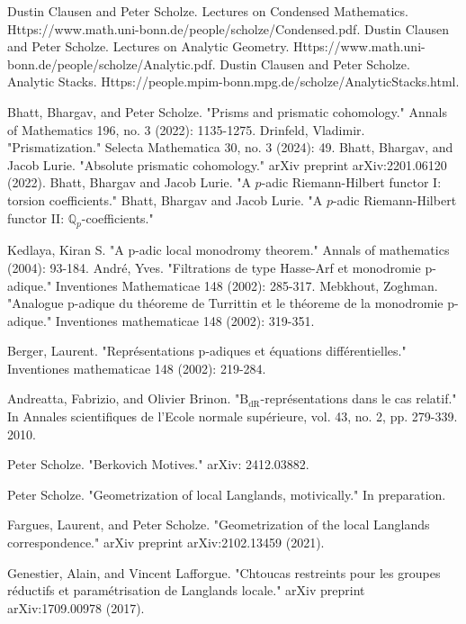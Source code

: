 \documentclass[12pt]{article}
\theoremstyle{definition}
\begin{document}
\begin{thebibliography}{}
 Dustin Clausen and Peter Scholze. Lectures on Condensed Mathematics. Https://www.math.uni-bonn.de/people/scholze/Condensed.pdf.
 Dustin Clausen and Peter Scholze. Lectures on Analytic Geometry. Https://www.math.uni-bonn.de/people/scholze/Analytic.pdf.
 Dustin Clausen and Peter Scholze. Analytic Stacks. Https://people.mpim-bonn.mpg.de/scholze/AnalyticStacks.html.

 Bhatt, Bhargav, and Peter Scholze. "Prisms and prismatic cohomology." Annals of Mathematics 196, no. 3 (2022): 1135-1275. 
 Drinfeld, Vladimir. "Prismatization." Selecta Mathematica 30, no. 3 (2024): 49.
 Bhatt, Bhargav, and Jacob Lurie. "Absolute prismatic cohomology." arXiv preprint arXiv:2201.06120 (2022).
 Bhatt, Bhargav and Jacob Lurie. "A $p$-adic Riemann-Hilbert functor I: torsion coefficients."
 Bhatt, Bhargav and Jacob Lurie. "A $p$-adic Riemann-Hilbert functor II: $\mathbb{Q}_p$-coefficients."

 Kedlaya, Kiran S. "A p-adic local monodromy theorem." Annals of mathematics (2004): 93-184.
 Andr\'e, Yves. "Filtrations de type Hasse-Arf et monodromie p-adique." Inventiones Mathematicae 148 (2002): 285-317.
 Mebkhout, Zoghman. "Analogue p-adique du th\'eoreme de Turrittin et le th\'eoreme de la monodromie p-adique." Inventiones mathematicae 148 (2002): 319-351.

 Berger, Laurent. "Repr\'esentations p-adiques et \'equations diff\'erentielles." Inventiones mathematicae 148 (2002): 219-284.

 Andreatta, Fabrizio, and Olivier Brinon. "$\mathrm {B} _ {\mathrm {dR}} $-repr\'esentations dans le cas relatif." In Annales scientifiques de l'Ecole normale sup\'erieure, vol. 43, no. 2, pp. 279-339. 2010.

 Peter Scholze. "Berkovich Motives." arXiv: 2412.03882.

 Peter Scholze. "Geometrization of local Langlands, motivically." In preparation.

 Fargues, Laurent, and Peter Scholze. "Geometrization of the local Langlands correspondence." arXiv preprint arXiv:2102.13459 (2021).

 Genestier, Alain, and Vincent Lafforgue. "Chtoucas restreints pour les groupes r\'eductifs et param\'etrisation de Langlands locale." arXiv preprint arXiv:1709.00978 (2017).


\end{thebibliography}
\end{document}

